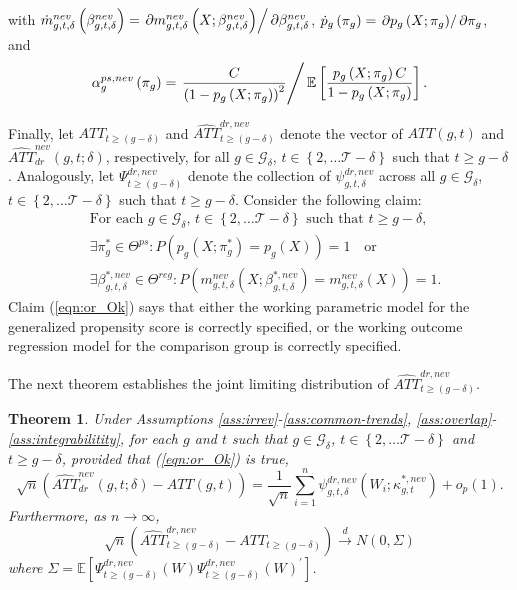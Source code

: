 \documentclass[11pt]{article}%
\theoremstyle{plain}
\newtheorem{theorem}{Theorem}
\numberwithin{sassumption}{section}
\numberwithin{equation}{section}
\begin{document}
with $\dot{m}_{g,t,\delta}^{nev}\left(  \beta_{g,t,\delta}^{nev}\right)
=\left.  \partial m_{g,t,\delta}^{nev}\left(  X;\beta_{g,t,\delta}%
^{nev}\right)  \right/  \partial\beta_{g,t,\delta}^{nev}$, $\dot{p}_{g}\left(
\pi_{g}\right)  =\left.  \partial p_{g}\left(  X;\pi_{g}\right)  \right/
\partial\pi_{g}$, and%
\[
\alpha_{g}^{ps,nev}\left(  \pi_{g}\right)  =\left.  \dfrac{C}{\left(
1-p_{g}\left(  X;\pi_{g}\right)  \right)  ^{2}}\right/  \mathbb{E}\left[
\dfrac{p_{g}\left(  X;\pi_{g}\right)  C}{1-p_{g}\left(  X;\pi_{g}\right)
}\right]  .
\]


Finally, let $ATT_{t\geq\left(  g-\delta\right)  }$ and $\widehat{ATT}%
_{t\geq\left(  g-\delta\right)  }^{dr,nev}$ denote the vector of $ATT(g,t)$
and $\widehat{ATT}_{dr}^{nev}(g,t;\delta)$, respectively, for all $g \in\mathcal{G}_\delta$, $t\in\left\{  2,\dots\mathcal{T-\delta
}\right\}  $ such that $t\geq g-\delta$. Analogously, let $\Psi_{t\geq\left(
g-\delta\right)  }^{dr,nev}$ denote the collection of $\psi_{g,t,\delta
}^{dr,nev}$ across all $g \in\mathcal{G}_\delta$,
$t\in\left\{  2,\dots\mathcal{T-\delta}\right\}  $ such that $t\geq g-\delta$.
Consider the following claim:%
\begin{align}
&  \text{For each } g \in\mathcal{G}_\delta \text{, }%
t\in\left\{  2,\dots\mathcal{T-\delta}\right\}  \text{ such that }t\geq
g-\delta\text{, }\nonumber\\
&  \exists\pi_{g}^{\ast}\in\Theta^{ps}:P\left(  p_{g}(X;\pi_{g}^{\ast}%
)=p_{g}\left(  X\right)  \right)  =1\text{ ~~or}\label{eqn:or_Ok}\\
&  \exists\beta_{g,t,\delta}^{\ast,nev}\in\Theta^{reg}:P\left(  m_{g,t,\delta
}^{nev}\left(  X;\beta_{g,t,\delta}^{\ast,nev}\right)  =m_{g,t,\delta}%
^{nev}\left(  X\right)  \right)  =1.\nonumber
\end{align}
Claim (\ref{eqn:or_Ok}) says that either the working parametric model for the
generalized propensity score is correctly specified, or the working outcome
regression model for the comparison group is correctly specified.

The next theorem establishes the joint limiting distribution of $\widehat{ATT}%
_{t\geq\left(  g-\delta\right)  }^{dr,nev}$.

\begin{theorem}
\label{thm:2} Under Assumptions \ref{ass:irrev}-\ref{ass:common-trends},
\ref{ass:overlap}-\ref{ass:integrabilitity}, for each $g$ and $t$ such that
$g\in\mathcal{G}_{\delta}$, $t\in\left\{  2,\dots\mathcal{T-\delta}\right\}  $
and $t\geq g-\delta$, provided that (\ref{eqn:or_Ok}) is true,%
\[
\sqrt{n}(\widehat{ATT}_{dr}^{nev}\left(  g,t;\delta\right)  -ATT\left(
g,t\right)  )=\frac{1}{\sqrt{n}}\sum_{i=1}^{n}\psi_{g,t,\delta}^{dr,nev}%
(W_{i};\kappa_{g,t}^{\ast,nev})+o_{p}(1).
\]
Furthermore, as $n\rightarrow\infty$,%
\[
\sqrt{n}(\widehat{ATT}_{t\geq\left(  g-\delta\right)  }^{dr,nev}%
-ATT_{t\geq\left(  g-\delta\right)  })\xrightarrow{d}N(0,\Sigma)
\]
where $\Sigma=\mathbb{E}[\Psi_{t\geq\left(  g-\delta\right)  }^{dr,nev}%
(W)\Psi_{t\geq\left(  g-\delta\right)  }^{dr,nev}(W)^{\prime}]$.
\end{theorem}
\end{document}
